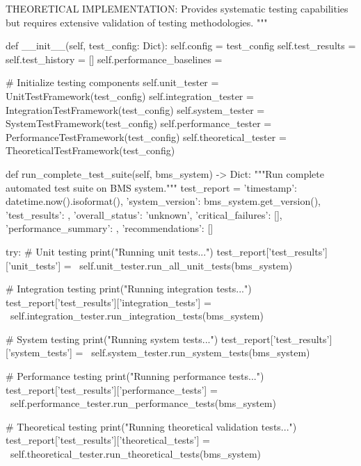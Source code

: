     THEORETICAL IMPLEMENTATION: Provides systematic testing capabilities
    but requires extensive validation of testing methodologies.
    """
    
    def __init__(self, test_config: Dict):
        self.config = test_config
        self.test_results = {}
        self.test_history = []
        self.performance_baselines = {}
        
        \# Initialize testing components
        self.unit_tester = UnitTestFramework(test_config)
        self.integration_tester = IntegrationTestFramework(test_config)
        self.system_tester = SystemTestFramework(test_config)
        self.performance_tester = PerformanceTestFramework(test_config)
        self.theoretical_tester = TheoreticalTestFramework(test_config)
        
    def run_complete_test_suite(self, bms_system) -> Dict:
        """Run complete automated test suite on BMS system."""
        test_report = {
            'timestamp': datetime.now().isoformat(),
            'system_version': bms_system.get_version(),
            'test_results': {},
            'overall_status': 'unknown',
            'critical_failures': [],
            'performance_summary': {},
            'recommendations': []
        }
        
        try:
            \# Unit testing
            print("Running unit tests...")
            test_report['test_results']['unit_tests'] = \
                self.unit_tester.run_all_unit_tests(bms_system)
            
            \# Integration testing
            print("Running integration tests...")
            test_report['test_results']['integration_tests'] = \
                self.integration_tester.run_integration_tests(bms_system)
            
            \# System testing
            print("Running system tests...")
            test_report['test_results']['system_tests'] = \
                self.system_tester.run_system_tests(bms_system)
            
            \# Performance testing
            print("Running performance tests...")
            test_report['test_results']['performance_tests'] = \
                self.performance_tester.run_performance_tests(bms_system)
            
            \# Theoretical testing
            print("Running theoretical validation tests...")
            test_report['test_results']['theoretical_tests'] = \
                self.theoretical_tester.run_theoretical_tests(bms_system)
            
